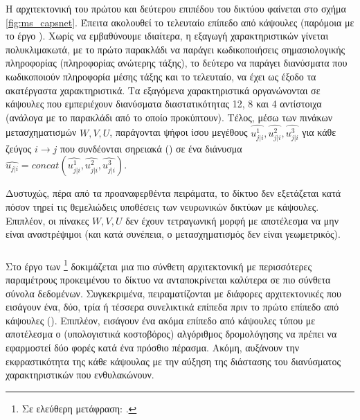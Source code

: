 Η αρχιτεκτονική του πρώτου και δεύτερου επιπέδου του δικτύου φαίνεται στο σχήμα \ref{fig:ms_capsnet}. Έπειτα ακολουθεί το τελευταίο επίπεδο από κάψουλες (παρόμοια με το έργο \cite{sabour2017dynamic}). Χωρίς να εμβαθύνουμε ιδιαίτερα, η εξαγωγή χαρακτηριστικών γίνεται πολυκλιμακωτά, με το πρώτο παρακλάδι να παράγει κωδικοποιήσεις σημασιολογικής πληροφορίας (πληροφορίας ανώτερης τάξης), το δεύτερο να παράγει διανύσματα που κωδικοποιούν πληροφορία μέσης τάξης και το τελευταίο, να έχει ως έξοδο τα ακατέργαστα χαρακτηριστικά. Τα εξαγόμενα χαρακτηριστικά οργανώνονται σε κάψουλες που εμπεριέχουν διανύσματα διαστατικότητας 12, 8 και 4 αντίστοιχα (ανάλογα με το παρακλάδι από το οποίο προκύπτουν). Τέλος, μέσω των πινάκων μετασχηματισμών $W, V, U$, παράγονται ψήφοι ίσου μεγέθους  $\hat{u^1_{j|i}}, \hat{u^2_{j|i}}, \hat{u^3_{j|i}}$ για κάθε ζεύγος $i \rightarrow j$ που συνδέονται σηρειακά () σε ένα διάνυσμα $\hat{u_{j|i}} = concat(\hat{u^1_{j|i}}, \hat{u^2_{j|i}}, \hat{u^3_{j|i}})$.\par

Δυστυχώς, πέρα από τα προαναφερθέντα πειράματα, το δίκτυο δεν εξετάζεται κατά πόσον τηρεί τις θεμελιώδεις υποθέσεις των νευρωνικών δικτύων με κάψουλες. Επιπλέον, οι πίνακες $W, V, U$ δεν έχουν τετραγωνική μορφή με αποτέλεσμα να μην είναι αναστρέψιμοι (και κατά συνέπεια, ο μετασχηματισμός δεν είναι γεωμετρικός).

\subsubsection{}

Στο έργο των  \footnote{Σε ελεύθερη μετάφραση: .} \cite{liu2019ddrm} δοκιμάζεται μια πιο σύνθετη αρχιτεκτονική με περισσότερες παραμέτρους προκειμένου το δίκτυο να ανταποκρίνεται καλύτερα σε πιο σύνθετα σύνολα δεδομένων. Συγκεκριμένα, πειραματίζονται με διάφορες αρχιτεκτονικές που εισάγουν ένα, δύο, τρία ή τέσσερα συνελικτικά επίπεδα πριν το πρώτο επίπεδο από κάψουλες (). Επιπλέον, εισάγουν ένα ακόμα επίπεδο από κάψουλες τύπου  με αποτέλεσμα ο (υπολογιστικά κοστοβόρος) αλγόριθμος δρομολόγησης να πρέπει να εφαρμοστεί δύο φορές κατά ένα πρόσθιο πέρασμα. Ακόμη, αυξάνουν την εκφραστικότητα της κάθε κάψουλας με την αύξηση της διάστασης του διανύσματος χαρακτηριστικών που ενθυλακώνουν.\par

